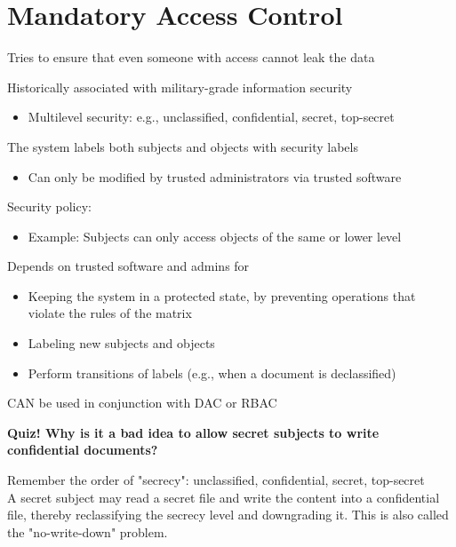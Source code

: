 \documentclass[11pt]{article}
\begin{document}
\section*{Mandatory Access Control}

Tries to ensure that even someone with access cannot leak the data

Historically associated with military-grade information security

\begin{itemize}
	\item Multilevel security: e.g., unclassified, confidential, secret, top-secret
\end{itemize}

The system labels both subjects and objects with security labels
\begin{itemize}
	\item Can only be modified by trusted administrators via trusted software
\end{itemize}

Security policy:
\begin{itemize}
	\item Example: Subjects can only access objects of the same or lower level
\end{itemize}

Depends on trusted software and admins for
\begin{itemize}
	\item Keeping the system in a protected state, by preventing operations that violate the rules of the matrix
	\item Labeling new subjects and objects
	\item Perform transitions of labels (e.g., when a document is declassified) 
\end{itemize}

CAN be used in conjunction with DAC or RBAC

\begin{tcolorbox}[
  colback=gray!15,     %
  colframe=black!50,    %
  boxrule=1pt,       %
  arc=3mm,             %
  left=4mm, right=4mm, top=2mm, bottom=2mm %
]
\textbf{Quiz! Why is it a bad idea to allow secret subjects to write confidential documents?}

\vspace{0.3cm}

Remember the order of "secrecy": unclassified, confidential, secret, top-secret \\

A secret subject may read a secret file and write the content into a confidential file, thereby reclassifying the secrecy level and downgrading it. This is also called the "no-write-down" problem.
\end{tcolorbox}
\end{document}
